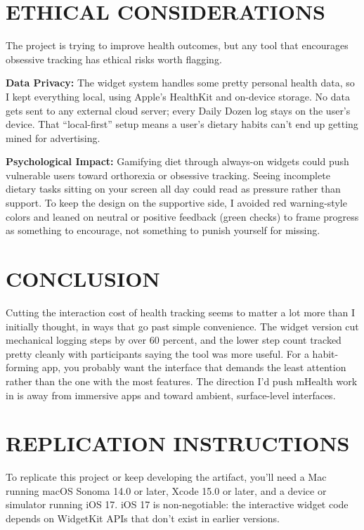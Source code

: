 \documentclass[10pt,twocolumn]{article}
\begin{document}
\section{ETHICAL CONSIDERATIONS}

The project is trying to improve health outcomes, but any tool that encourages obsessive tracking has ethical risks worth flagging.

\noindent\textbf{Data Privacy:} The widget system handles some pretty personal health data, so I kept everything local, using Apple's HealthKit and on-device storage.\cite{AppleHIGWidgets} No data gets sent to any external cloud server; every Daily Dozen log stays on the user's device. That ``local-first'' setup means a user's dietary habits can't end up getting mined for advertising.

\noindent\textbf{Psychological Impact:} Gamifying diet through always-on widgets could push vulnerable users toward orthorexia or obsessive tracking.\cite{HayesSirensCall} Seeing incomplete dietary tasks sitting on your screen all day could read as pressure rather than support. To keep the design on the supportive side, I avoided red warning-style colors and leaned on neutral or positive feedback (green checks) to frame progress as something to encourage, not something to punish yourself for missing.

\section{CONCLUSION}

Cutting the interaction cost of health tracking seems to matter a lot more than I initially thought, in ways that go past simple convenience. The widget version cut mechanical logging steps by over 60 percent, and the lower step count tracked pretty cleanly with participants saying the tool was more useful. For a habit-forming app, you probably want the interface that demands the least attention rather than the one with the most features. The direction I'd push mHealth work in is away from immersive apps and toward ambient, surface-level interfaces.

\section{REPLICATION INSTRUCTIONS}

To replicate this project or keep developing the artifact, you'll need a Mac running macOS Sonoma 14.0 or later, Xcode 15.0 or later, and a device or simulator running iOS 17. iOS 17 is non-negotiable: the interactive widget code depends on WidgetKit APIs that don't exist in earlier versions.
\end{document}
